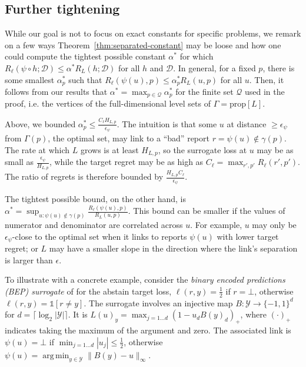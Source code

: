 \documentclass{article}
\theoremstyle{definition}\newtheorem{definition}{Definition}
\theoremstyle{definition}\newtheorem{assumption}{Assumption}
\DeclareMathOperator*{\argmin}{arg\,min}
\newcommand{\prop}[1]{\mathrm{prop}[#1]}
\newcommand{\D}{\mathcal{D}}
\newcommand{\Y}{\mathcal{Y}}
\newcommand{\ones}{\mathds{1}}  %
\begin{document}
\subsection{Further tightening}
While our goal is not to focus on exact constants for specific problems, we remark on a few ways Theorem~\ref{thm:separated-constant} may be loose and how one could compute the tightest possible constant $\alpha^*$ for which $R_{\ell}(\psi \circ h;\D) \leq \alpha^* R_L(h;\D)$ for all $h$ and $\D$.
In general, for a fixed $p$, there is some smallest $\alpha_p^*$ such that $R_{\ell}(\psi(u),p) \leq \alpha_p^* R_L(u,p)$ for all $u$.
Then, it follows from our results that $\alpha^* = \max_{p \in \mathcal{Q}} \alpha_p^*$ for the finite set $\mathcal{Q}$ used in the proof, i.e. the vertices of the full-dimensional level sets of $\Gamma = \prop{L}$.

Above, we bounded $\alpha_p^* \leq \frac{C_{\ell} H_{L,p}}{\epsilon_{\psi}}$.
The intuition is that some $u$ at distance $\geq \epsilon_{\psi}$ from $\Gamma(p)$, the optimal set, may link to a ``bad'' report $r = \psi(u) \not\in \gamma(p)$.
The rate at which $L$ grows is at least $H_{L,p}$, so the surrogate loss at $u$ may be as small as $\frac{\epsilon_{\psi}}{H_{L,p}}$, while the target regret may be as high as $C_{\ell} = \max_{r',p'} R_{\ell}(r',p')$.
The ratio of regrets is therefore bounded by $\frac{H_{L,p} C_{\ell}}{\epsilon_{\psi}}$.

The tightest possible bound, on the other hand, is $\alpha^* = \sup_{u: \psi(u) \not\in \gamma(p)} \frac{R_{\ell}(\psi(u),p)}{R_L(u,p)}$.
This bound can be smaller if the values of numerator and denominator are correlated across $u$.
For example, $u$ may only be $\epsilon_{\psi}$-close to the optimal set when it links to reports $\psi(u)$ with lower target regret; or $L$ may have a smaller slope in the direction where the link's separation is larger than $\epsilon$.

To illustrate with a concrete example, consider the \emph{binary encoded predictions (BEP) surrogate} of \cite{ramaswamy2018consistent} for the abstain target loss, $\ell(r,y) = \frac{1}{2}$ if $r = \bot$, otherwise $\ell(r,y) = \ones[r \neq y]$.
The surrogate involves an injective map $B: \Y \to \{-1,1\}^d$ for $d = \lceil \log_2 |\Y| \rceil$.
It is $L(u)_y = \max_{j=1\dots d} (1 - u_d B(y)_d)_+$, where $(\cdot)_+$ indicates taking the maximum of the argument and zero.
The associated link is $\psi(u) = \bot$ if $\min_{j=1\dots d} |u_j| \leq \tfrac{1}{2}$, otherwise $\psi(u) = \argmin_{y \in \Y} \|B(y) - u\|_{\infty}$.
\end{document}
